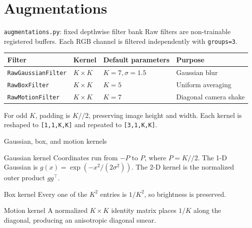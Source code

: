 \documentclass[aspectratio=169,10pt]{beamer}
\newcommand{\shape}[1]{\texttt{#1}}
\newcommand{\file}[1]{\texttt{#1}}
\newcommand{\code}[1]{\texttt{#1}}
\begin{document}
\section{Augmentations}

\begin{frame}{\file{augmentations.py}: fixed depthwise filter bank}
  Raw filters are non-trainable registered buffers. Each RGB channel is filtered
  independently with \code{groups=3}.
  \vspace{0.5em}
  \centering
  \begin{tabular}{llll}
    \toprule
    Filter & Kernel & Default parameters & Purpose\\
    \midrule
    \code{RawGaussianFilter} & $K\times K$ & $K=7,\sigma=1.5$ & Gaussian blur\\
    \code{RawBoxFilter} & $K\times K$ & $K=5$ & Uniform averaging\\
    \code{RawMotionFilter} & $K\times K$ & $K=7$ & Diagonal camera shake\\
    \bottomrule
  \end{tabular}
  \vspace{0.6em}
  For odd $K$, padding is $K//2$, preserving image height and width. Each
  kernel is reshaped to \shape{[1,1,K,K]} and repeated to
  \shape{[3,1,K,K]}.
\end{frame}

\begin{frame}{Gaussian, box, and motion kernels}
  \begin{block}{Gaussian kernel}
    Coordinates run from $-P$ to $P$, where $P=K//2$. The 1-D Gaussian is
    $g(x)=\exp(-x^2/(2\sigma^2))$. The 2-D kernel is the normalized outer
    product $gg^\top$.
  \end{block}
  \begin{block}{Box kernel}
    Every one of the $K^2$ entries is $1/K^2$, so brightness is preserved.
  \end{block}
  \begin{block}{Motion kernel}
    A normalized $K\times K$ identity matrix places $1/K$ along the diagonal,
    producing an anisotropic diagonal smear.
  \end{block}
\end{frame}
\end{document}
